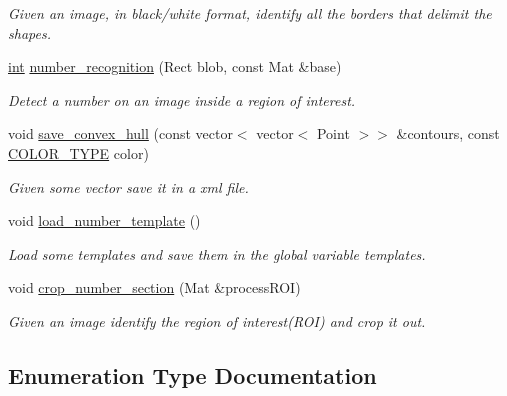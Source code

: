 \begin{DoxyCompactItemize}
\begin{DoxyCompactList}\small\item\em Given an image, in black/white format, identify all the borders that delimit the shapes. \end{DoxyCompactList}\item 
\mbox{\hyperlink{draw_8hh_aa620a13339ac3a1177c86edc549fda9b}{int}} \mbox{\hyperlink{detection_8hh_a785fcf35ca81d113a1ea3d831fbdbc22}{number\+\_\+recognition}} (Rect blob, const Mat \&base)
\begin{DoxyCompactList}\small\item\em Detect a number on an image inside a region of interest. \end{DoxyCompactList}\item 
void \mbox{\hyperlink{detection_8hh_a79a1c18ddf68e72685d61376ff24948b}{save\+\_\+convex\+\_\+hull}} (const vector$<$ vector$<$ Point $>$$>$ \&contours, const \mbox{\hyperlink{detection_8hh_aef17e8300db831cb13df4975928a52cb}{C\+O\+L\+O\+R\+\_\+\+T\+Y\+PE}} color)
\begin{DoxyCompactList}\small\item\em Given some vector save it in a xml file. \end{DoxyCompactList}\item 
void \mbox{\hyperlink{detection_8hh_a50993b0aa4f01d89a4e5d0aef4e1e5f4}{load\+\_\+number\+\_\+template}} ()
\begin{DoxyCompactList}\small\item\em Load some templates and save them in the global variable \textquotesingle{}templates\textquotesingle{}. \end{DoxyCompactList}\item 
void \mbox{\hyperlink{detection_8hh_a8edaf0da54add7cd1461bafecef26b56}{crop\+\_\+number\+\_\+section}} (Mat \&process\+R\+OI)
\begin{DoxyCompactList}\small\item\em Given an image identify the region of interest(\+R\+O\+I) and crop it out. \end{DoxyCompactList}\end{DoxyCompactItemize}


\subsection{Enumeration Type Documentation}
\mbox{\label{detection_8hh_aef17e8300db831cb13df4975928a52cb}} 
